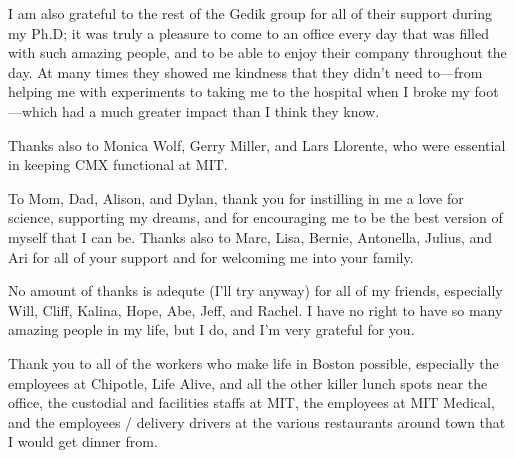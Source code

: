 I am also grateful to the rest of the Gedik group for all of their support during my Ph.D; it was truly a pleasure to come to an office every day that was filled with such amazing people, and to be able to enjoy their company throughout the day.
At many times they showed me kindness that they didn't need to---from helping me with experiments to taking me to the hospital when I broke my foot---which had a much greater impact than I think they know.

Thanks also to Monica Wolf, Gerry Miller, and Lars Llorente, who were essential in keeping CMX functional at MIT.

To Mom, Dad, Alison, and Dylan, thank you for instilling in me a love for science, supporting my dreams, and for encouraging me to be the best version of myself that I can be.
Thanks also to Marc, Lisa, Bernie, Antonella, Julius, and Ari for all of your support and for welcoming me into your family.

No amount of thanks is adequte (I'll try anyway) for all of my friends, especially Will, Cliff, Kalina, Hope, Abe, Jeff, and Rachel.
I have no right to have so many amazing people in my life, but I do, and I'm very grateful for you.

Thank you to all of the workers who make life in Boston possible, especially the employees at Chipotle, Life Alive, and all the other killer lunch spots near the office, the custodial and facilities staffs at MIT, the employees at MIT Medical, and the employees / delivery drivers at the various restaurants around town that I would get dinner from.


